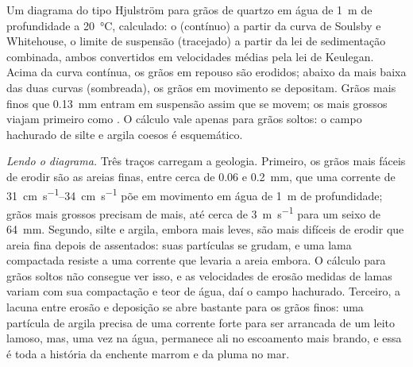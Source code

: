 \begin{omfigure}
{\small Um diagrama do tipo Hjulström para grãos de quartzo em água de \qty{1}{m} de profundidade a \qty{20}{\celsius}, calculado: o  (contínuo) a partir da curva de Soulsby e Whitehouse, o limite de suspensão (tracejado) a partir da lei de sedimentação combinada, ambos convertidos em velocidades médias pela lei de Keulegan. Acima da curva contínua, os grãos em repouso são erodidos; abaixo da mais baixa das duas curvas (sombreada), os grãos em movimento se depositam. Grãos mais finos que \qty{0.13}{mm} entram em suspensão assim que se movem; os mais grossos viajam primeiro como . O cálculo vale apenas para grãos soltos: o campo hachurado de silte e argila coesos é esquemático.}
\label{fig:b1:erosion-transport:hjulstrom}
\end{omfigure}

\emph{Lendo o diagrama.} Três traços carregam a geologia. Primeiro, os grãos mais fáceis de erodir são as areias finas, entre cerca de \num{0.06} e \qty{0.2}{mm}, que uma corrente de \qtyrange{31}{34}{cm.s^{-1}} põe em movimento em água de \qty{1}{m} de profundidade; grãos mais grossos precisam de mais, até cerca de \qty{3}{m.s^{-1}} para um seixo de \qty{64}{mm}. Segundo, silte e argila, embora mais leves, são mais difíceis de erodir que areia fina depois de assentados: suas partículas se grudam, e uma lama compactada resiste a uma corrente que levaria a areia embora. O cálculo para grãos soltos não consegue ver isso, e as velocidades de erosão medidas de lamas variam com sua compactação e teor de água, daí o campo hachurado. Terceiro, a lacuna entre erosão e deposição se abre bastante para os grãos finos: uma partícula de argila precisa de uma corrente forte para ser arrancada de um leito lamoso, mas, uma vez na água, permanece ali no escoamento mais brando, e essa é toda a história da enchente marrom e da pluma no mar.

